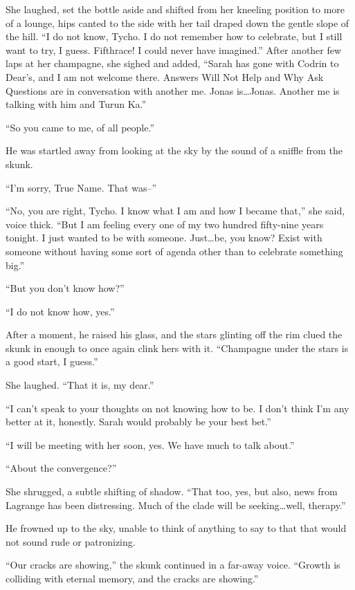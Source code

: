 She laughed, set the bottle aside and shifted from her kneeling position to more of a lounge, hips canted to the side with her tail draped down the gentle slope of the hill. ``I do not know, Tycho. I do not remember how to celebrate, but I still want to try, I guess. Fifthrace! I could never have imagined.'' After another few laps at her champagne, she sighed and added, ``Sarah has gone with Codrin to Dear's, and I am not welcome there. Answers Will Not Help and Why Ask Questions are in conversation with another me. Jonas is\ldots Jonas. Another me is talking with him and Turun Ka.''

``So you came to me, of all people.''

He was startled away from looking at the sky by the sound of a sniffle from the skunk.

``I'm sorry, True Name. That was--''

``No, you are right, Tycho. I know what I am and how I became that,'' she said, voice thick. ``But I am feeling every one of my two hundred fifty-nine years tonight. I just wanted to be with someone. Just\ldots be, you know? Exist with someone without having some sort of agenda other than to celebrate something big.''

``But you don't know how?''

``I do not know how, yes.''

After a moment, he raised his glass, and the stars glinting off the rim clued the skunk in enough to once again clink hers with it. ``Champagne under the stars is a good start, I guess.''

She laughed. ``That it is, my dear.''

``I can't speak to your thoughts on not knowing how to be. I don't think I'm any better at it, honestly. Sarah would probably be your best bet.''

``I will be meeting with her soon, yes. We have much to talk about.''

``About the convergence?''

She shrugged, a subtle shifting of shadow. ``That too, yes, but also, news from Lagrange has been distressing. Much of the clade will be seeking\ldots well, therapy.''

He frowned up to the sky, unable to think of anything to say to that that would not sound rude or patronizing.

``Our cracks are showing,'' the skunk continued in a far-away voice. ``Growth is colliding with eternal memory, and the cracks are showing.''

